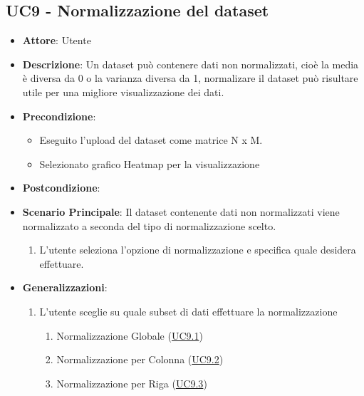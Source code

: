     \subsection{UC9 - Normalizzazione del dataset}
    \begin{itemize}
    \item \textbf{Attore}: Utente
    \item \textbf{Descrizione}: Un dataset può contenere dati non normalizzati, cioè la media è diversa da 0 o la varianza diversa da 1, normalizare il dataset può risultare utile per una migliore visualizzazione dei dati.
    \item \textbf{Precondizione}: 
    \begin{itemize}
        \item Eseguito l'upload del dataset come matrice N x M.
        \item Selezionato grafico Heatmap per la visualizzazione
    \end{itemize}  
    \item \textbf{Postcondizione}: 
    \item \textbf{Scenario Principale}: Il dataset contenente dati non normalizzati viene normalizzato a seconda del tipo di normalizzazione scelto.
    \begin{enumerate}
        \item L'utente seleziona l'opzione di normalizzazione e specifica quale desidera effettuare.
    \end{enumerate}  
    \item \textbf{Generalizzazioni}: 
     \begin{enumerate}
            \item L'utente sceglie su quale subset di dati effettuare la normalizzazione
                \begin{enumerate}
                    \item Normalizzazione Globale (\hyperref[uc9.1]{UC9.1})
                    \item Normalizzazione per Colonna (\hyperref[uc9.2]{UC9.2})
                    \item Normalizzazione per Riga (\hyperref[uc9.3]{UC9.3})
                \end{enumerate}
        \end{enumerate}  
    \end{itemize}
    
